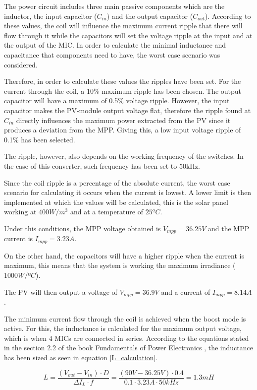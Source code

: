 The power circuit includes three main passive components which are the inductor, the input capacitor ($C_{in}$) and the output capacitor ($C_{out}$). According to these values, the coil will influence the maximum current ripple that there will flow through it while the capacitors will set the voltage ripple at the input and at the output of the MIC. In order to calculate the minimal inductance and capacitance that components need to have, the worst case scenario was considered.

Therefore, in order to calculate these values the ripples have been set. For the current through the coil, a 10\% maximum ripple has been chosen. The output capacitor will  have a maximum of 0.5\% voltage ripple. However, the input capacitor makes the PV-module output voltage flat, therefore the ripple found at $C_{in}$ directly influences the maximum power extracted from the PV since it produces a deviation from the MPP. Giving this, a low input voltage ripple of 0.1\% has been selected.

The ripple, however, also depends on the working frequency of the switches. In the case of this converter, such frequency has been set to 50kHz. 

Since the coil ripple is a percentage of the absolute current, the worst case scenario for calculating it occurs when the current is lowest. A lower limit is then implemented at which the values will be calculated, this is the solar panel working at $400 W/m^3$ and at a temperature of $25 ºC$.

Under this conditions, the MPP voltage obtained is $V_{mpp} = 36.25 V$ and the MPP current is $I_{mpp} = 3.23A$.

On the other hand, the capacitors will have a higher ripple when the current is maximum, this means that the system is working the maximum irradiance ($1000 W/ºC$). 

The PV will then output a voltage of $V_{mpp} = 36.9 V$ and a current of $I_{mpp} = 8.14 A$.

The minimum current flow through the coil is achieved when the boost mode is active. For this, the inductance is calculated for the maximum output voltage, which is when 4 MICs are connected in series. According to the equations stated in the section 2.2 of the book Fundamentals of Power Electronics \cite{Erickson}, the inductance has been sized as seen in equation \ref{L_calculation}.

\begin{equation} \label{L_calculation}
L = \frac{(V_{out} - V_{in}) \cdot D}{\Delta I_{L} \cdot f} = \frac{(90 V - 36.25 V) \cdot 0.4}{0.1 \cdot 3.23 A \cdot 50 kHz} = 1.3 mH
\end{equation}

